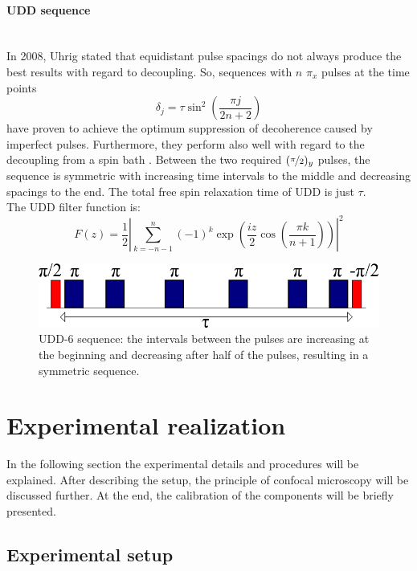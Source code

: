 \documentclass[12pt,a4paper]{article}
\begin{document}
\paragraph{UDD sequence}\label{udd}\mbox{}\\
In 2008, Uhrig stated that equidistant pulse spacings do not always produce the best results with regard to decoupling\cite{udd}. So, sequences with $n$ $\pi_x$ pulses at the time points
\begin{equation}\label{udde}
\delta_j=\tau\sin^2\left(\frac{\pi j}{2n+2}\right)
\end{equation}
have proven to achieve the optimum suppression of decoherence caused by imperfect pulses. Furthermore, they perform also well with regard to the decoupling from a spin bath \cite{udd}. Between the two required $(\nicefrac{\pi}{2})_y$ pulses, the sequence is symmetric with increasing time intervals to the middle and decreasing spacings to the end. The total free spin relaxation time of UDD is just $\tau$.\\
The UDD filter function is:
\begin{equation}
F(z)=\frac{1}{2}\left|\sum^n_{k=-n-1}(-1)^k\exp\left(\frac{iz}{2}\cos\left(\frac{\pi k}{n+1}\right)\right)\right|^2
\end{equation}
\begin{figure}[H]
\centering
\includegraphics[scale=0.4]{UDD1.png} 
\caption{UDD-6 sequence: the intervals between the pulses are increasing at the beginning and decreasing after half of the pulses, resulting in a symmetric sequence.}
\end{figure} 

\section{Experimental realization}
In the following section the experimental details and procedures will be explained. After describing the setup, the principle of confocal microscopy will be discussed further. At the end, the calibration of the components will be briefly presented. 
\subsection{Experimental setup}
\end{document}
